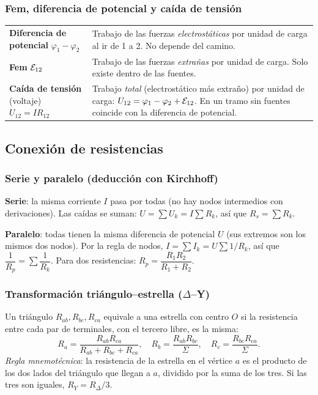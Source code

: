 \documentclass[11pt]{article}
\begin{document}
\subsubsection*{Fem, diferencia de potencial y caída de tensión}
\begin{center}
\small
\begin{tabularx}{\linewidth}{@{}p{3.5cm}X@{}}
\toprule
\textbf{Diferencia de potencial} $\varphi_1-\varphi_2$ & Trabajo de las fuerzas \emph{electrostáticas} por unidad de carga al ir de 1 a 2. No depende del camino.\\
\textbf{Fem} $\mathcal{E}_{12}$ & Trabajo de las fuerzas \emph{extrañas} por unidad de carga. Solo existe dentro de las fuentes.\\
\textbf{Caída de tensión} (voltaje) $U_{12}=IR_{12}$ & Trabajo \emph{total} (electrostático más extraño) por unidad de carga: $U_{12}=\varphi_1-\varphi_2+\mathcal{E}_{12}$. En un tramo sin fuentes coincide con la diferencia de potencial.\\
\bottomrule
\end{tabularx}
\end{center}

\subsection{Conexión de resistencias}
\subsubsection*{Serie y paralelo (deducción con Kirchhoff)}
\textbf{Serie}: la misma corriente $I$ pasa por todas (no hay nodos intermedios con derivaciones). Las caídas se suman: $U=\sum U_k=I\sum R_k$, así que $\boxed{R_s=\sum R_k}$.

\textbf{Paralelo}: todas tienen la misma diferencia de potencial $U$ (sus extremos son los mismos dos nodos). Por la regla de nodos, $I=\sum I_k=U\sum 1/R_k$, así que $\boxed{\dfrac1{R_p}=\sum\dfrac1{R_k}}$. Para dos resistencias: $R_p=\dfrac{R_1R_2}{R_1+R_2}$.

\subsubsection*{Transformación triángulo--estrella ($\Delta$--Y)}
Un triángulo $R_{ab},R_{bc},R_{ca}$ equivale a una estrella con centro $O$ si la resistencia entre cada par de terminales, con el tercero libre, es la misma:
\[
R_a=\frac{R_{ab}R_{ca}}{R_{ab}+R_{bc}+R_{ca}},\quad R_b=\frac{R_{ab}R_{bc}}{\Sigma},\quad R_c=\frac{R_{bc}R_{ca}}{\Sigma}.
\]
\emph{Regla mnemotécnica}: la resistencia de la estrella en el vértice $a$ es el producto de los dos lados del triángulo que llegan a $a$, dividido por la suma de los tres. Si las tres son iguales, $R_Y=R_\Delta/3$.
\end{document}
